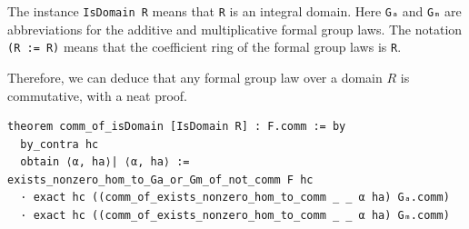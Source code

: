 The instance \lstinline|IsDomain R| means that \lstinline|R| is an integral domain.
Here \lstinline|Gₐ| and \lstinline|Gₘ| are abbreviations for the additive and multiplicative formal group laws.
The notation \lstinline|(R := R)| means that the coefficient ring of the
formal group laws is \lstinline|R|.

Therefore, we can deduce that any formal group law over a domain $R$ is commutative, with a
neat proof.

\begin{lstlisting}
theorem comm_of_isDomain [IsDomain R] : F.comm := by
  by_contra hc
  obtain ⟨α, ha⟩| ⟨α, ha⟩ := exists_nonzero_hom_to_Ga_or_Gm_of_not_comm F hc
  · exact hc ((comm_of_exists_nonzero_hom_to_comm _ _ α ha) Gₐ.comm)
  · exact hc ((comm_of_exists_nonzero_hom_to_comm _ _ α ha) Gₘ.comm)
\end{lstlisting}

